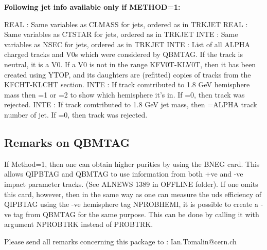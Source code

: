   {\bf    Following jet info available only if METHOD=1:}

\begin{indentlist}{ 3.50cm}{ 3.75cm}


        REAL  : Same variables as CLMASS for jets, ordered as in TRKJET
        REAL  : Same variables as CTSTAR for jets, ordered as in TRKJET
        INTE   : Same variables as NSEC   for jets, ordered as in TRKJET
               INTE : List of all ALPHA charged tracks and V0s which
                     were considered by QBMTAG.
                     If the track is neutral, it is a V0. If a V0
                     is not in the range KFV0T-KLV0T, then it has
                     been created using YTOP, and its daughters
                     are (refitted) copies of tracks from the
                     KFCHT-KLCHT section.
        INTE : If track comtributed to 1.8 GeV hemisphere mass
                     then =1 or =2 to show which hemisphere it's in.
                     If =0, then track was rejected.
        INTE : If track comtributed to 1.8 GeV jet mass,
                     then =ALPHA track number of jet.
                     If =0, then track was rejected.
\end{indentlist}



\par
\subsection{\label{sec-QBMTAM}Remarks on QBMTAG}
\par

     If  Method=1, then one can obtain higher purities by using the
      BNEG card. This allows QIPBTAG and QBMTAG to use information from
      both +ve and -ve impact parameter tracks. (See ALNEWS 1389 in
      OFFLINE folder). If one omits this card, however, then in the same
      way as one can measure the uds efficiency of QIPBTAG using the -ve
      hemisphere tag NPROBHEMI, it is possible to create a -ve tag from
      QBMTAG for the same purpose. This can be done by calling it with
      argument NPROBTRK instead of PROBTRK.


      Please send all remarks concerning this package to :
      Ian.Tomalin@cern.ch
   

\par
